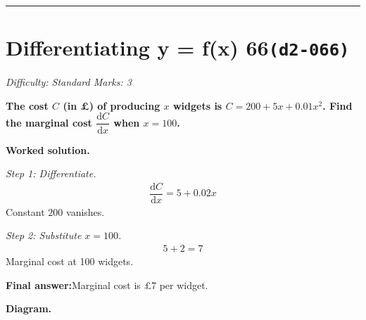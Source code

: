 \documentclass[11pt]{article}
\newcommand{\question}[1]{\par\medskip\noindent\textbf{#1}\par}
\begin{document}
\medskip\hrule

\section*{Differentiating y = f(x) 66\quad\small\texttt{(d2-066)}}
\textit{Difficulty: Standard \quad\textbar\quad Marks: 3}

\question{The cost \( C \) (in \pounds ) of producing \( x \) widgets is \( C = 200 + 5x + 0.01x^2 \). Find the marginal cost \( \dfrac{\mathrm{d}C}{\mathrm{d}x} \) when \( x = 100 \).}

\textbf{Worked solution.}

\textit{Step 1: Differentiate.}
\[\begin{gathered}
\dfrac{\mathrm{d}C}{\mathrm{d}x} = 5 + 0.02x
\end{gathered}\]
Constant \( 200 \) vanishes.

\textit{Step 2: Substitute \( x = 100 \).}
\[\begin{gathered}
5 + 2 = 7
\end{gathered}\]
Marginal cost at 100 widgets.

\begin{answerbox}
\textbf{Final answer:}\quad Marginal cost is \pounds 7 per widget.
\end{answerbox}
\textbf{Diagram.}
\end{document}
